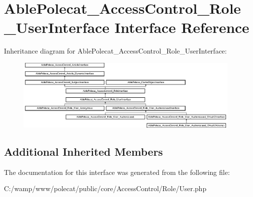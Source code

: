 \hypertarget{interface_able_polecat___access_control___role___user_interface}{}\section{Able\+Polecat\+\_\+\+Access\+Control\+\_\+\+Role\+\_\+\+User\+Interface Interface Reference}
\label{interface_able_polecat___access_control___role___user_interface}
Inheritance diagram for Able\+Polecat\+\_\+\+Access\+Control\+\_\+\+Role\+\_\+\+User\+Interface\+:\begin{figure}[H]
\begin{center}
\leavevmode
\includegraphics[height=3.497267cm]{interface_able_polecat___access_control___role___user_interface}
\end{center}
\end{figure}
\subsection*{Additional Inherited Members}


The documentation for this interface was generated from the following file\+:\begin{DoxyCompactItemize}
\item 
C\+:/wamp/www/polecat/public/core/\+Access\+Control/\+Role/User.\+php\end{DoxyCompactItemize}
